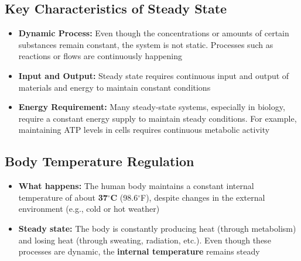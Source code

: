 \documentclass[10pt]{article}
\begin{document}
\subsection*{Key Characteristics of Steady State}
\begin{itemize}
    \item \textbf{Dynamic Process:} Even though the concentrations or amounts of certain substances remain constant, the system is not static.  Processes such as reactions or flows are continuously happening
    \item \textbf{Input and Output:} Steady state requires continuous input and output of materials and energy to maintain constant conditions
    \item \textbf{Energy Requirement:} Many steady-state systems, especially in biology, require a constant energy supply to maintain steady conditions.  For example, maintaining ATP levels in cells requires continuous metabolic activity
\end{itemize}
\subsection*{Body Temperature Regulation}
\begin{itemize}
    \item \textbf{What happens:} The human body maintains a constant internal temperature of about \textbf{37$^\circ$C} (98.6$^\circ$F), despite changes in the external environment (e.g., cold or hot weather)
    \item \textbf{Steady state:} The body is constantly producing heat (through metabolism) and losing heat (through sweating, radiation, etc.).  Even though these processes are dynamic, the \textbf{internal temperature} remains steady
\end{itemize}
\begin{center}
\end{center}
\end{document}
